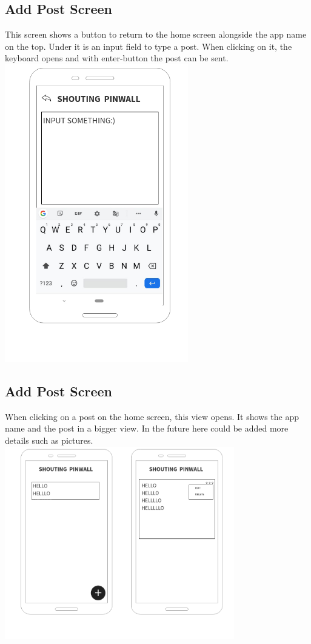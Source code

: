 \documentclass[conference]{IEEEtran}
\numberwithin{figure}{subsection}
\begin{document}
\subsection{Add Post Screen}
This screen shows a button to return to the home screen alongside the app name on the top. Under it is an input field to type a post. When clicking on it, the keyboard opens and with enter-button the post can be sent.\\
\includegraphics[width=8cm]{bibtex/images/Add_Post_Screen.png}

\subsection{Add Post Screen}
When clicking on a post on the home screen, this view opens. It shows the app name and the post in a bigger view. In the future here could be added more details such as pictures.\\
\includegraphics[width=10cm]{bibtex/images/Post_Viewing_Screen.png}


			
\end{document}
